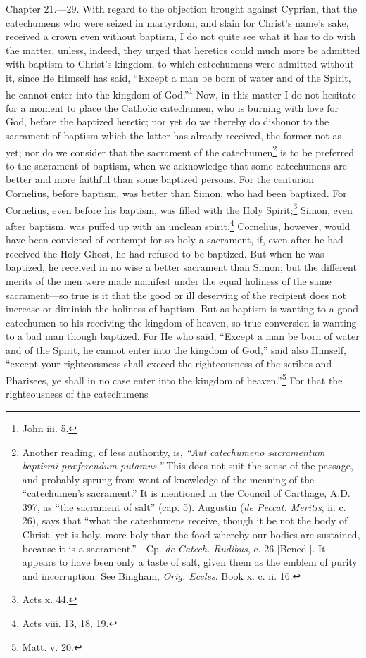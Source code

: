 
Chapter 21.—29. With regard to the objection brought against Cyprian, that the catechumens who were seized in martyrdom, and slain for Christ’s name’s sake, received a crown even without baptism, I do not quite see what it has to do with the matter, unless, indeed, they urged that heretics could much more be admitted with baptism to Christ’s kingdom, to which catechumens were admitted without it, since He Himself has said, ``Except a man be born of water and of the Spirit, he cannot enter into the kingdom of God.''\footnote{\par  John iii. 5.} Now, in this matter I do not hesitate for a moment to place the Catholic catechumen, who is burning with love for God, before the baptized heretic; nor yet do we thereby do dishonor to the sacrament of baptism which the latter has already received, the former not as yet; nor do we consider that the sacrament of the catechumen\footnote{\par  Another reading, of less authority, is, \emph{ ``Aut catechumeno sacramentum baptismi præferendum putamus.''} This does not suit the sense of the passage, and probably sprung from want of knowledge of the meaning of the ``catechumen’s sacrament.'' It is mentioned in the Council of Carthage, A.D. 397, as ``the sacrament of salt'' (cap. 5). Augustin (\emph{de Peccat. Meritis}, ii. c. 26), says that ``what the catechumens receive, though it be not the body of Christ, yet is holy, more holy than the food whereby our bodies are sustained, because it is a sacrament.''—Cp. \emph{de Catech. Rudibus}, c. 26 [Bened.]. It appears to have been only a taste of salt, given them as the emblem of purity and incorruption. See Bingham, \emph{ Orig. Eccles}. Book x. c. ii. 16.} is to be preferred to the sacrament of baptism, when we acknowledge that some catechumens are better and more faithful than some baptized persons. For the centurion Cornelius, before baptism, was better than Simon, who had been baptized. For Cornelius, even before his baptism, was filled with the Holy Spirit;\footnote{\par  Acts x. 44.} Simon, even after baptism, was puffed up with an unclean spirit.\footnote{\par  Acts viii. 13, 18, 19.} Cornelius, however, would have been convicted of contempt for so holy a sacrament, if, even after he had received the Holy Ghost, he had refused to be baptized. But when he was baptized, he received in no wise a better sacrament than Simon; but the different merits of the men were made manifest under the equal holiness of the same sacrament—so true is it that the good or ill deserving of the recipient does not increase or diminish the holiness of baptism. But as baptism is wanting to a good catechumen to his receiving the kingdom of heaven, so true conversion is wanting to a bad man though baptized. For He who said, ``Except a man be born of water and of the Spirit, he cannot enter into the kingdom of God,'' said also Himself, ``except your righteousness shall exceed the righteousness of the scribes and Pharisees, ye shall in no case enter into the kingdom of heaven.''\footnote{\par  Matt. v. 20.} For that the righteousness of the catechumens 